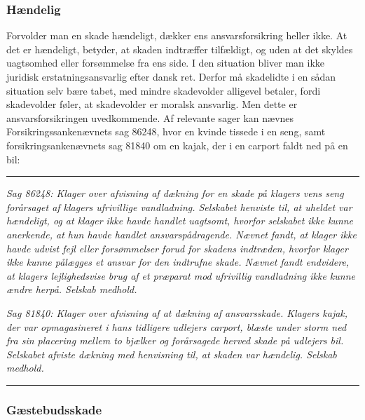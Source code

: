 \documentclass[]{book}
\begin{document}
\hypertarget{hndelig}{%
\subsubsection{Hændelig}\label{hndelig}}

Forvolder man en skade hændeligt, dækker ens ansvarsforsikring heller ikke. At det er hændeligt, betyder, at skaden indtræffer tilfældigt, og uden at det skyldes uagtsomhed eller forsømmelse fra ens side. I den situation bliver man ikke juridisk erstatningsansvarlig efter dansk ret. Derfor må skadelidte i en sådan situation selv bære tabet, med mindre skadevolder alligevel betaler, fordi skadevolder føler, at skadevolder er moralsk ansvarlig. Men dette er ansvarsforsikringen uvedkommende. Af relevante sager kan nævnes Forsikringssankenævnets sag 86248, hvor en kvinde tissede i en seng, samt forsikringsankenævnets sag 81840 om en kajak, der i en carport faldt ned på en bil:

\begin{center}\rule{0.5\linewidth}{\linethickness}\end{center}

\emph{Sag 86248: Klager over afvisning af dækning for en skade på klagers vens seng forårsaget af klagers ufrivillige vandladning. Selskabet henviste til, at uheldet var hændeligt, og at klager ikke havde handlet uagtsomt, hvorfor selskabet ikke kunne anerkende, at hun havde handlet ansvarspådragende. Nævnet fandt, at klager ikke havde udvist fejl eller forsømmelser forud for skadens indtræden, hvorfor klager ikke kunne pålægges et ansvar for den indtrufne skade. Nævnet fandt endvidere, at klagers lejlighedsvise brug af et præparat mod ufrivillig vandladning ikke kunne ændre herpå. Selskab medhold.}

\emph{Sag 81840: Klager over afvisning af at dækning af ansvarsskade. Klagers kajak, der var opmagasineret i hans tidligere udlejers carport, blæste under storm ned fra sin placering mellem to bjælker og forårsagede herved skade på udlejers bil. Selskabet afviste dækning med henvisning til, at skaden var hændelig. Selskab medhold.}

\begin{center}\rule{0.5\linewidth}{\linethickness}\end{center}

\hypertarget{gstebudsskade}{%
\subsubsection{Gæstebudsskade}\label{gstebudsskade}}
\end{document}
